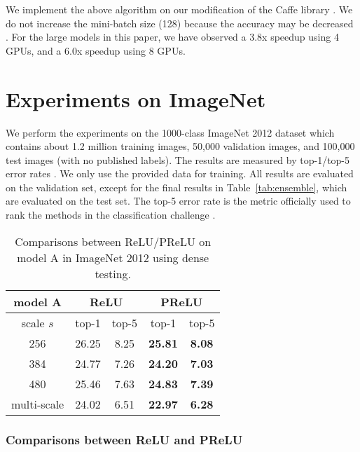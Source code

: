 \documentclass[10pt,twocolumn,letterpaper]{article}
\begin{document}
We implement the above algorithm on our modification of the Caffe library \cite{Jia2014}. 
We do not increase the mini-batch size (128) because the accuracy may be decreased \cite{Krizhevsky2014}. For the large models in this paper, we have observed a 3.8x speedup using 4 GPUs, and a 6.0x speedup using 8 GPUs.

\section{Experiments on ImageNet}

We perform the experiments on the 1000-class ImageNet 2012 dataset \cite{Russakovsky2014} which contains about 1.2 million training images, 50,000 validation images, and 100,000 test images (with no published labels). The results are measured by top-1/top-5 error rates \cite{Russakovsky2014}. We only use the provided data for training. All results are evaluated on the validation set, except for the final results in Table~\ref{tab:ensemble}, which are evaluated on the test set. The top-5 error rate is the metric officially used to rank the methods in the classification challenge \cite{Russakovsky2014}.

\setlength{\tabcolsep}{12pt}
\begin{table}[t]
\begin{center}
\small
\begin{tabular}{c|cc|cc}
\hline
 model A & \multicolumn{2}{c|}{ReLU} & \multicolumn{2}{c}{PReLU} \\
\hline
  scale $s$  & top-1 & top-5 & top-1 & top-5 \\
\hline
\hline
256 & 26.25 & 8.25 & \textbf{25.81} & \textbf{8.08} \\
384 & 24.77 & 7.26 & \textbf{24.20} & \textbf{7.03} \\
480 & 25.46 & 7.63 & \textbf{24.83} & \textbf{7.39} \\
\hline
multi-scale & 24.02 & 6.51 & \textbf{22.97} & \textbf{6.28} \\
\hline
\end{tabular}
\end{center}
\caption{Comparisons between ReLU/PReLU on model A in ImageNet 2012 using dense testing.}
\label{tab:model_a}
\end{table}

\subsubsection*{Comparisons between ReLU and PReLU}
\end{document}
